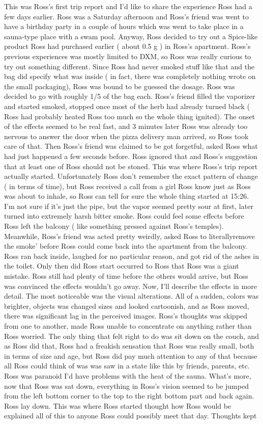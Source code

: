 \documentclass[12pt]{book}
\begin{document}
This was Ross's first trip report and I'd like to share the experience Ross had a few days earlier. Ross was a Saturday afternoon and Ross's friend was went to have a birthday party in a couple of hours which was went to take place in a sauna-type place with a swam pool. Anyway, Ross decided to try out a Spice-like product Ross had purchased earlier ( about 0.5 g ) in Ross's apartment. Ross's previous experiences was mostly limited to DXM, so Ross was really curious to try out something different. Since Ross had never smoked stuff like that and the bag did specify what was inside ( in fact, there was completely nothing wrote on the small packaging), Ross was bound to be guessed the dosage. Ross was decided to go with roughly 1/5 of the bag each. Ross's friend filled the vaporizer and started smoked, stopped once most of the herb had already turned black ( Ross had probably heated Ross too much so the whole thing ignited). The onset of the effects seemed to be real fast, and 3 minutes later Ross was already too nervous to answer the door when the pizza delivery man arrived, so Ross took care of that. Then Ross's friend was claimed to be got forgetful, asked Ross what had just happened a few seconds before. Ross ignored that and Ross's suggestion that at least one of Ross should not be stoned. This was where Ross's trip report actually started. Unfortunately Ross don't remember the exact pattern of change ( in terms of time), but Ross received a call from a girl Ross know just as Ross was about to inhale, so Ross can tell for sure the whole thing started at 15:26. I'm not sure if it's just the pipe, but the vapor seemed pretty sour at first, later turned into extremely harsh bitter smoke. Ross could feel some effects before Ross left the balcony ( like something pressed against Ross's temples). Meanwhile, Ross's friend was acted pretty weirdly, asked Ross to literallyremove the smoke' before Ross could come back into the apartment from the balcony. Ross ran back inside, laughed for no particular reason, and got rid of the ashes in the toilet. Only then did Ross start occurred to Ross that Ross was a giant mistake. Ross still had plenty of time before the others would arrive, but Ross was convinced the effects wouldn't go away. Now, I'll describe the effects in more detail. The most noticeable was the visual alterations. All of a sudden, colors was brighter, objects was changed sizes and looked cartoonish, and as Ross moved, there was significant lag in the perceived images. Ross's thoughts was skipped from one to another, made Ross unable to concentrate on anything rather than Ross worried. The only thing that felt right to do was sit down on the couch, and as Ross did that, Ross had a freakish sensation that Ross was really small, both in terms of size and age, but Ross did pay much attention to any of that because all Ross could think of was was saw in a state like this by friends, parents, etc. Ross was paranoid I'd have problems with the heat of the sauna. What's more, now that Ross was sat down, everything in Ross's vision seemed to be jumped from the left bottom corner to the top to the right bottom part and back again. Ross lay down. This was where Ross started thought how Ross would be explained all of this to anyone Ross could possibly meet that day. Thoughts kept 
\end{document}
